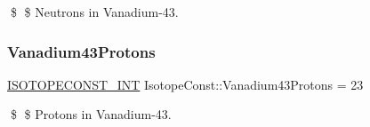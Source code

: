 \$ \$ Neutrons in Vanadium-\/43. \mbox{\label{group___isotope_const-_vanadium-_v43_ga1879c45f46ea09e5194ff22a55c1ef07}} 
\subsubsection{\texorpdfstring{Vanadium43\+Protons}{Vanadium43Protons}}
{\footnotesize\ttfamily \mbox{\hyperlink{group___isotope_const-_macros_ga5f18360b3e99483a35c32d789e62621c}{I\+S\+O\+T\+O\+P\+E\+C\+O\+N\+S\+T\+\_\+\+I\+NT}} Isotope\+Const\+::\+Vanadium43\+Protons = 23}

\$ \$ Protons in Vanadium-\/43. 